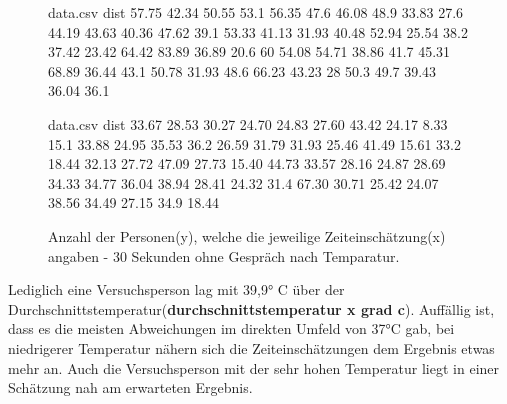 \documentclass{Paper}
\begin{document}
\begin{figure}[H]
\begin{filecontents}{data.csv}
dist
  57.75
 42.34
 50.55
 53.1
 56.35
 47.6
 46.08
 48.9
 33.83
 27.6
 44.19
 43.63
 40.36
 47.62
 39.1
 53.33
 41.13
 31.93
 40.48
 52.94
25.54
 38.2
37.42
23.42
 64.42
 83.89
36.89
20.6
 60
 54.08 
 54.71
 38.86
 41.7
 45.31
 68.89
36.44
 43.1
50.78
31.93
48.6
66.23
 43.23
 28
 50.3
 49.7
 39.43
 36.04
36.1
\end{filecontents}
\begin{minipage}[t]{0.49\linewidth}
\caption{Anzahl der Personen(y), welche die jeweilige Zeiteinschätzung(x) angaben - 40 Sekunden ohne Gespräch nach Temperatur.}
\label{HistZeit40sekTemp}
\end{minipage}
\hfill
\begin{filecontents}{data.csv}
dist
  33.67
 28.53
 30.27
 24.70
 24.83
 27.60
 43.42
 24.17
 8.33
 15.1
 33.88
 24.95
 35.53
 36.2
 26.59
 31.79
 31.93
 25.46
 41.49
 15.61
 33.2
 18.44
 32.13
 27.72
 47.09
 27.73
 15.40
 44.73
 33.57
 28.16 
 24.87
 28.69
 34.33
 34.77
 36.04
 38.94
 28.41
 24.32
 31.4
 67.30
 30.71
 25.42
 24.07
 38.56
 34.49
 27.15 
 34.9
18.44
\end{filecontents}
\begin{minipage}[t]{0.49\linewidth}
\caption{Anzahl der Personen(y), welche die jeweilige Zeiteinschätzung(x) angaben - 30 Sekunden ohne Gespräch nach Temparatur.}
\label{HistZeit30sekTemp}
\end{minipage}
\end{figure}


Lediglich eine Versuchsperson lag mit 39,9° C über der Durchschnittstemperatur(\textbf{durchschnittstemperatur x grad c}). Auffällig ist, dass es die meisten Abweichungen im direkten Umfeld von 37°C gab, bei niedrigerer Temperatur nähern sich die Zeiteinschätzungen dem Ergebnis etwas mehr an. Auch die Versuchsperson mit der sehr hohen Temperatur liegt in einer Schätzung nah am erwarteten Ergebnis.
\end{document}

